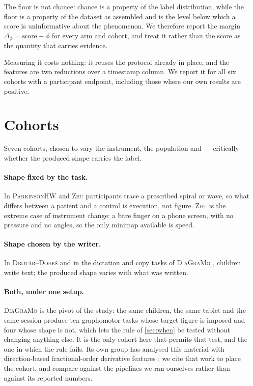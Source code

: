 \documentclass{article}
\begin{document}
The floor is not chance: chance is a property of the label distribution, while the floor is a
property of the dataset as assembled and is the level below which a score is uninformative about the
phenomenon. We therefore report the margin $\Delta_\phi = \text{score} - \phi$ for every arm and
cohort, and treat it rather than the score as the quantity that carries evidence.

Measuring it costs nothing: it reuses the protocol already in place, and the features are two
reductions over a timestamp column. We report it for all six cohorts with a participant endpoint,
including those where our own results are positive.

\section{Cohorts}
\label{sec:cohorts}

Seven cohorts, chosen to vary the instrument, the population and --- critically --- whether the
produced shape carries the label.

\paragraph{Shape fixed by the task.} In \textsc{ParkinsonHW} \citep{isenkul2013parkinsonhw} and
\textsc{Zhu} \citep{zhu2025smartphone} participants trace a
prescribed spiral or wave, so what differs between a patient and a control is execution, not
figure. \textsc{Zhu} is the extreme case of instrument change: a bare finger on a phone screen,
with no pressure and no angles, so the only minimap available is speed.

\paragraph{Shape chosen by the writer.} In \textsc{Drot\'ar--Dobe\v{s}}
\citep{drotar2020dysgraphia} and in the dictation and copy tasks of \textsc{DiaGraMo}
\citep{zvoncakova2026diagramo}, children write text; the produced shape varies with what was
written.

\paragraph{Both, under one setup.} \textsc{DiaGraMo} is the pivot of the study: the same children,
the same tablet and the same session produce ten graphomotor tasks whose target figure is imposed
and four whose shape is not, which lets the rule of \cref{sec:when} be tested without
changing anything else. It is the only cohort here that permits that test, and the one in which the
rule fails. Its own group has analysed this material with
direction-based fractional-order derivative features \citep{gavenciak2025fractional}; we cite that
work to place the cohort, and compare against the pipelines we ran ourselves rather than against
its reported numbers.
\end{document}
